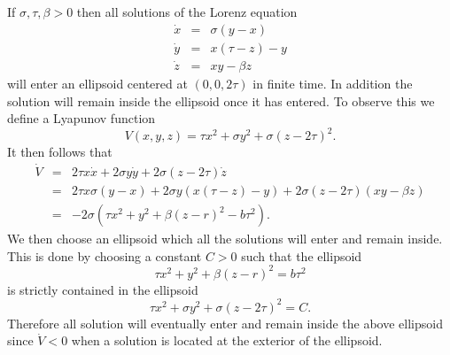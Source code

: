 \documentclass[12pt]{article}
\begin{document}
If $\sigma, \tau, \beta >0$ then all solutions of the Lorenz equation
\begin{eqnarray*}
\dot{x} & = & \sigma(y-x)\\
\dot{y} & = & x(\tau - z) -y\\
\dot{z} & = & xy - \beta z
\end{eqnarray*}
will enter an ellipsoid centered at $(0,0,2\tau )$ in finite time.  
In addition the solution will remain inside the ellipsoid once it 
has entered. To observe this we define a Lyapunov function
$$V(x,y,z)=\tau x^2 + \sigma y^2 + \sigma (z-2\tau )^2.$$  It then
follows that
\begin{eqnarray*}
\dot{V} & = & 2\tau x\dot{x} + 2\sigma y\dot{y} + 2\sigma (z-2\tau )\dot{z}\\
& = & 2\tau x\sigma(y-x) + 2\sigma y(x(\tau - z) -y) + 2\sigma (z-2\tau )(xy - \beta z)\\
& = & -2\sigma (\tau x^2 + y^2 + \beta(z -r)^2 -b\tau^2).
\end{eqnarray*}
We then choose an ellipsoid which all the solutions will enter and 
remain inside.  This is done by choosing a constant $C>0$ such that
the ellipsoid
$$\tau x^2 + y^2 + \beta(z -r)^2 = b\tau^2$$
is strictly contained in the ellipsoid
$$\tau x^2 + \sigma y^2 + \sigma (z-2\tau )^2=C.$$
Therefore all solution will eventually enter and remain inside the above ellipsoid since $\dot{V}<0$ when a solution is located at the exterior of the 
ellipsoid.
\end{document}
